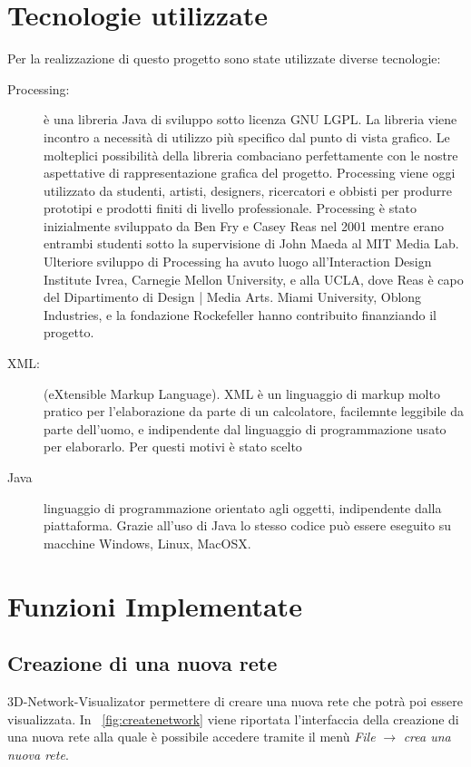 \documentclass[a4paper,12pt]{article}
\begin{document}
\section{Tecnologie utilizzate}
Per la realizzazione di questo progetto sono state utilizzate diverse tecnologie:
\begin{description}
 \item[Processing:] \`e una libreria Java di sviluppo sotto licenza GNU LGPL. La libreria viene incontro a necessità di utilizzo più specifico dal punto di vista grafico. Le molteplici possibilità della libreria combaciano perfettamente con le nostre aspettative di rappresentazione grafica del progetto. Processing viene oggi utilizzato da studenti, artisti, designers, ricercatori e obbisti per produrre prototipi e prodotti finiti di livello professionale. Processing \`e stato inizialmente sviluppato da Ben Fry e Casey Reas nel 2001 mentre erano entrambi studenti sotto la supervisione di John Maeda al MIT Media Lab. Ulteriore sviluppo di Processing ha avuto luogo all'Interaction Design Institute Ivrea, Carnegie Mellon University, e alla UCLA, dove Reas \`e capo del Dipartimento di Design | Media Arts. Miami University, Oblong Industries, e la fondazione Rockefeller hanno contribuito finanziando il progetto.
 \item[XML:] (eXtensible Markup Language). XML \`e un linguaggio di markup molto pratico per l'elaborazione da parte di un calcolatore, facilemnte leggibile da parte dell'uomo, e indipendente dal linguaggio di programmazione usato per elaborarlo. Per questi motivi \`e stato scelto
 \item[Java] linguaggio di programmazione orientato agli oggetti, indipendente dalla piattaforma. Grazie all'uso di Java lo stesso codice pu\`o essere eseguito su macchine Windows, Linux, MacOSX.
\end{description}
        
\section{Funzioni Implementate}
 
\subsection{Creazione di una nuova rete}
3D-Network-Visualizator permettere di creare una nuova rete che potr\`a poi essere visualizzata. In \figurename~\ref{fig:createnetwork} viene riportata l'interfaccia della creazione di una nuova rete alla quale \`e possibile accedere tramite il men\`u  \textit{File} $\rightarrow$ \textit{crea una nuova rete}.
\end{document}
